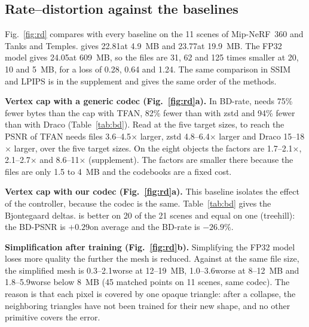 
\subsection{Rate--distortion against the baselines}
\label{sec:rd}
Fig.~\ref{fig:rd} compares \BM with every baseline on the 11 scenes of Mip-NeRF~360 and Tanks and Temples. \BM gives 22.81\dB at 4.9~MB and 23.77\dB at 19.9~MB. The FP32 model gives 24.05\dB at 609~MB, so the files are 31, 62 and 125 times smaller at 20, 10 and 5~MB, for a loss of 0.28, 0.64 and 1.24\dB. The same comparison in SSIM and LPIPS is in the supplement and gives the same order of the methods.

\noindent\textbf{Vertex cap with a generic codec (Fig.~\ref{fig:rd}a).} In BD-rate, \BM needs 75\% fewer bytes than the cap with TFAN, 82\% fewer than with zstd and 94\% fewer than with Draco (Table~\ref{tab:bd}). Read at the five target sizes, to reach the PSNR of \BM TFAN needs files 3.6--4.5$\times$ larger, zstd 4.8--6.4$\times$ larger and Draco 15--18$\times$ larger, over the five target sizes. On the eight objects the factors are 1.7--2.1$\times$, 2.1--2.7$\times$ and 8.6--11$\times$ (supplement). The factors are smaller there because the files are only 1.5 to 4~MB and the codebooks are a fixed cost.

\noindent\textbf{Vertex cap with our codec (Fig.~\ref{fig:rd}a).} This baseline isolates the effect of the controller, because the codec is the same. Table~\ref{tab:bd} gives the Bjontegaard deltas. \BM is better on 20 of the 21 scenes and equal on one (treehill): the BD-PSNR is $+0.29$\dB on average and the BD-rate is $-26.9\%$.

\noindent\textbf{Simplification after training (Fig.~\ref{fig:rd}b).} Simplifying the FP32 model loses more quality the further the mesh is reduced. Against \BM at the same file size, the simplified mesh is 0.3--2.1\dB worse at 12--19~MB, 1.0--3.6\dB worse at 8--12~MB and 1.8--5.9\dB worse below 8~MB (45 matched points on 11 scenes, same codec). The reason is that each pixel is covered by one opaque triangle: after a collapse, the neighboring triangles have not been trained for their new shape, and no other primitive covers the error.

